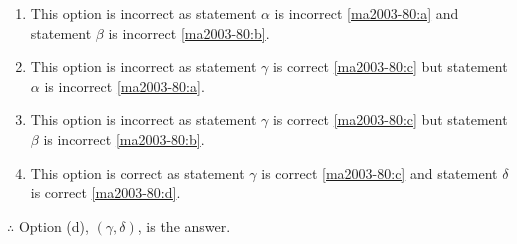 \begin{enumerate}[label=(\alph*)]
    \item This option is incorrect as statement $\alpha$ is incorrect \ref{ma2003-80:a} and statement $\beta$ is incorrect \ref{ma2003-80:b}.\\
    \item This option is incorrect as statement $\gamma$ is correct \ref{ma2003-80:c} but statement $\alpha$ is incorrect \ref{ma2003-80:a}.\\
    \item This option is incorrect as statement $\gamma$ is correct \ref{ma2003-80:c} but statement $\beta$ is incorrect \ref{ma2003-80:b}.\\
    \item This option is correct as statement $\gamma$ is correct \ref{ma2003-80:c} and statement $\delta$ is correct \ref{ma2003-80:d}.\\
\end{enumerate}
$\therefore$ Option (d), $(\gamma,\delta)$, is the answer.
